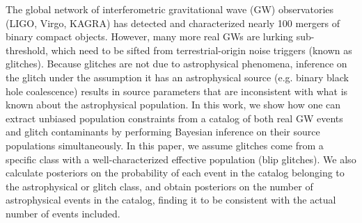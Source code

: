 
\begin{refsection}

\label{chapter: glitches}


\begin{chapterabstract}
The global network of interferometric gravitational wave (GW) observatories (LIGO, Virgo, KAGRA) has detected and characterized nearly 100 mergers of binary compact objects. However, many more real GWs are lurking sub-threshold, which need to be sifted from terrestrial-origin noise triggers (known as glitches). Because glitches are not due to astrophysical phenomena, inference on the glitch under the assumption it has an astrophysical source (e.g. binary black hole coalescence) results in source parameters that are inconsistent with what is known about the astrophysical population. In this work, we show how one can extract unbiased population constraints from a catalog of both real GW events and glitch contaminants by performing Bayesian inference on their source populations simultaneously. In this paper, we assume glitches come from a specific class with a well-characterized effective population (blip glitches). We also calculate posteriors on the probability of each event in the catalog belonging to the astrophysical or glitch class, and obtain posteriors on the number of astrophysical events in the catalog, finding it to be consistent with the actual number of events included.
\end{chapterabstract}



\end{refsection}

